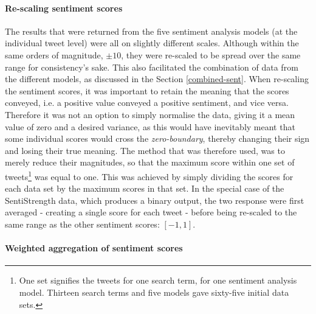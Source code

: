 \documentclass{article}
\begin{document}
\paragraph{Re-scaling sentiment scores \label{rescaling-sent}}
\label{sec-6-2-1-1}

The results that were returned from the five sentiment analysis models (at the individual tweet level) were all on slightly different scales. Although within the same orders of magnitude, $\pm 10$, they were re-scaled to be spread over the same range for consistency's sake. This also facilitated the combination of data from the different models, as discussed in the Section \ref{combined-sent}. When re-scaling the sentiment scores, it was important to retain the meaning that the scores conveyed, i.e. a positive value conveyed a positive sentiment, and vice versa. Therefore it was not an option to simply normalise the data, giving it a mean value of zero and a desired variance, as this would have inevitably meant that some individual scores would cross the \emph{zero-boundary}, thereby changing their sign and losing their true meaning. The method that was therefore used, was to merely reduce their magnitudes, so that the maximum score within one set of tweets\footnote{One set signifies the tweets for one search term, for one sentiment analysis model. Thirteen search terms and five models gave sixty-five initial data sets.} was equal to one. This was achieved by simply dividing the scores for each data set by the maximum scores in that set. In the special case of the SentiStrength data, which produces a binary output, the two response were first averaged - creating a single score for each tweet - before being re-scaled to the same range as the other sentiment scores: $[-1, 1]$.


\paragraph{Weighted aggregation of sentiment scores \label{weighting-sentiment}}
\label{sec-6-2-1-2}
\end{document}
